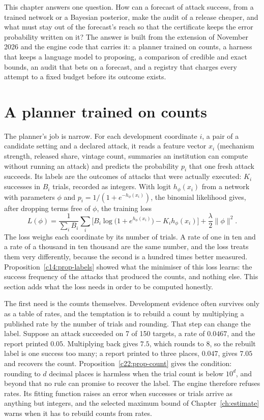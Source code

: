 This chapter answers one question. How can a forecast of attack success, from a trained network or
a Bayesian posterior, make the audit of a release cheaper, and what must stay out of the
forecast's reach so that the certificate keeps the error probability written on it? The answer is
built from the extension of November 2026 and the engine code that carries it: a planner trained
on counts, a harness that keeps a language model to proposing, a comparison of credible and exact
bounds, an audit that bets on a forecast, and a registry that charges every attempt to a fixed
budget before its outcome exists.

\section{A planner trained on counts}\label{c22:sec-planner}

The planner's job is narrow. For each development coordinate $i$, a pair of a candidate setting and
a declared attack, it reads a feature vector $x_i$ (mechanism strength, released share, vintage
count, summaries an institution can compute without running an attack) and predicts the
probability $p_i$ that one fresh attack succeeds. Its labels are the outcomes of attacks that were
actually executed: $K_i$ successes in $B_i$ trials, recorded as integers. With logit $h_\phi(x_i)$ from a
network with parameters $\phi$ and $p_i=1/(1+e^{-h_\phi(x_i)})$, the binomial likelihood gives, after
dropping terms free of $\phi$, the training loss
\begin{equation}\label{c22:eq-loss}
L(\phi)=\frac1{\sum_iB_i}\sum_i\Big[B_i\log\big(1+e^{h_\phi(x_i)}\big)-K_ih_\phi(x_i)\Big]+\frac\lambda2\|\phi\|^2.
\end{equation}
The loss weighs each coordinate by its number of trials. A rate of one in ten and a rate of a
thousand in ten thousand are the same number, and the loss treats them very differently, because
the second is a hundred times better measured. Proposition~\ref{c14:prop-labels} showed what the minimiser of this loss
learns: the success frequency of the attacks that produced the counts, and nothing else. This
section adds what the loss needs in order to be computed honestly.

The first need is the counts themselves. Development evidence often survives only as a table of
rates, and the temptation is to rebuild a count by multiplying a published rate by the number of
trials and rounding. That step can change the label. Suppose an attack succeeded on 7 of 150
targets, a rate of $0.0467$, and the report printed $0.05$. Multiplying back gives $7.5$, which rounds
to 8, so the rebuilt label is one success too many; a report printed to three places, $0.047$, gives
$7.05$ and recovers the count. Proposition~\ref{c22:prop-count} gives the condition: rounding to $d$ decimal places is
harmless when the trial count is below $10^d$, and beyond that no rule can promise to recover the
label. The engine therefore refuses rates. Its fitting function raises an error when successes or
trials arrive as anything but integers, and the selected maximum bound of Chapter~\ref{ch:estimate} warns when it
has to rebuild counts from rates.

